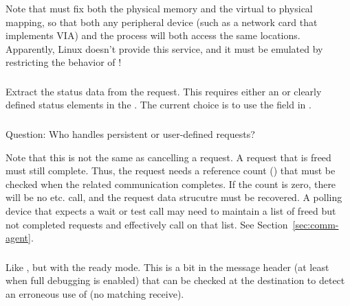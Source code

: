 \documentclass{article}
\begin{document}
Note that  must fix both the physical
memory and the virtual to physical mapping, so that both any
peripheral device (such as a network card that implements VIA) and the
process will both access the same locations.  Apparently, Linux
doesn't provide this service, and it must be emulated by restricting
the behavior of !

\subsubsection{}
Extract the status data from the request.
This requires either an  or clearly defined
status elements in the .  The current choice is
to use the  field in .


\subsubsection{}
\begin{adi3}
\end{adi3}
Question: Who handles persistent or user-defined requests?

Note that this is not the same as cancelling a request.  
A request that is freed must still complete.  Thus, the request needs
a reference count () that must be
checked when the related communication 
completes.  If the count is zero, there will be no 
etc. call, and the request data strucutre must be recovered.  A
polling device that expects a wait or test call may need to maintain a
list of freed but not completed requests and effectively call
 on that list.  See Section~\ref{sec:comm-agent}.

\subsubsection{}
Like , but with the ready mode.  This is a bit in
the message header (at least when full debugging is enabled) that can
be checked at the destination to detect an erroneous use of
 (no matching receive).
\end{document}
